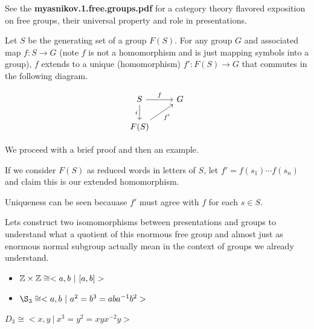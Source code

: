 \documentclass[10pt]{article}
\begin{document}
\begin{note}
	See the \textbf{myasnikov.1.free.groups.pdf} for a category theory flavored exposition on free
	groups, their universal property and role in presentations.
\end{note}

\begin{note}
Let $S$ be the generating set of a group $F(S)$. For any group $G$ and associated
map $f: S \to G$ (note $f$ is not a homomorphism and is just mapping symbols
into a group), $f$ extends to a unique (homomorphism) $f': F(S) \to G$ that commutes in the following diagram.

\[
\begin{tikzcd}
S \arrow[r, "f"] \arrow[d, "i"'] & G \\
F(S) \arrow[ru, "f'"']           &  
\end{tikzcd}
\]

We proceed with a brief proof and then an example.

If we consider $F(S)$ as reduced words in letters of $S$, let $f' =
f(s_1)\cdots f(s_n)$ and claim this is our extended homomorphism.

Uniqueness can be seen becauase $f'$ must agree with $f$ for each $s \in S$.

\end{note}

Lets construct two isomomorphisms between presentations and groups to understand
what a quotient of this enormous free group and almost just as enormous normal
subgroup actually mean in the context of groups we already understand.

\begin{itemize}
	\item{$\mathbb{Z} \times \mathbb{Z} \cong <a,b~|~[a,b]>$}
	\item{$\S_3 \cong <a,b~|~a^2=b^3=aba^{-1}b^2>$}
\end{itemize}

\begin{proposition}
	$D_3 \cong <x,y~|~x^3=y^2=xyx^{-2}y>$
\end{proposition}
\end{document}
